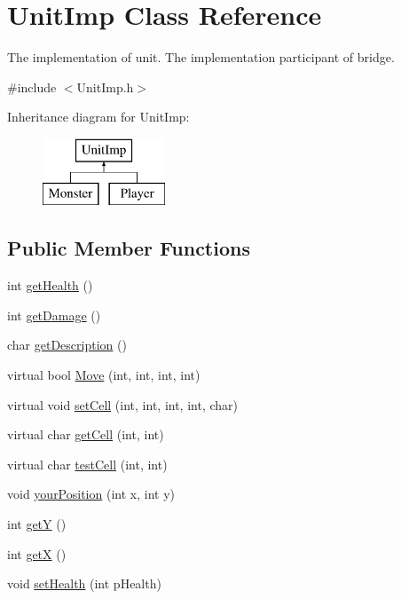 \hypertarget{class_unit_imp}{\section{\-Unit\-Imp \-Class \-Reference}
\label{class_unit_imp}
}


\-The implementation of unit. \-The implementation participant of bridge.  




{\ttfamily \#include $<$\-Unit\-Imp.\-h$>$}

\-Inheritance diagram for \-Unit\-Imp\-:\begin{figure}[H]
\begin{center}
\leavevmode
\includegraphics[height=2.000000cm]{class_unit_imp}
\end{center}
\end{figure}
\subsection*{\-Public \-Member \-Functions}
\begin{DoxyCompactItemize}
\item 
int \hyperlink{class_unit_imp_a03893cc4afecc82bc7b065f63fd7bb41}{get\-Health} ()
\item 
int \hyperlink{class_unit_imp_ab979127f81b58688ed5332e75792275e}{get\-Damage} ()
\item 
char \hyperlink{class_unit_imp_aec50862ee6702e73b2947ef330f70045}{get\-Description} ()
\item 
virtual bool \hyperlink{class_unit_imp_a387768f71574835545c7b50bfa6847e8}{\-Move} (int, int, int, int)
\item 
virtual void \hyperlink{class_unit_imp_a46b40de0053d38bdbb4a9c608135d7f1}{set\-Cell} (int, int, int, int, char)
\item 
virtual char \hyperlink{class_unit_imp_ae9682d287774c26e1293a7bcca0a4931}{get\-Cell} (int, int)
\item 
virtual char \hyperlink{class_unit_imp_a6d219ef4a2d31a72cd93cf2df9445b7a}{test\-Cell} (int, int)
\item 
void \hyperlink{class_unit_imp_a4f6368ca4bc256870c1466bdd36c8cab}{your\-Position} (int x, int y)
\item 
int \hyperlink{class_unit_imp_ac9d272bb195af8c2d6cd1401a5ade776}{get\-Y} ()
\item 
int \hyperlink{class_unit_imp_ace6f0ebfbc0eb8ba1f6ae7fbe9f0cd62}{get\-X} ()
\item 
void \hyperlink{class_unit_imp_a86f7cbf5782dde28b56770f38a032f72}{set\-Health} (int p\-Health)
\end{DoxyCompactItemize}


